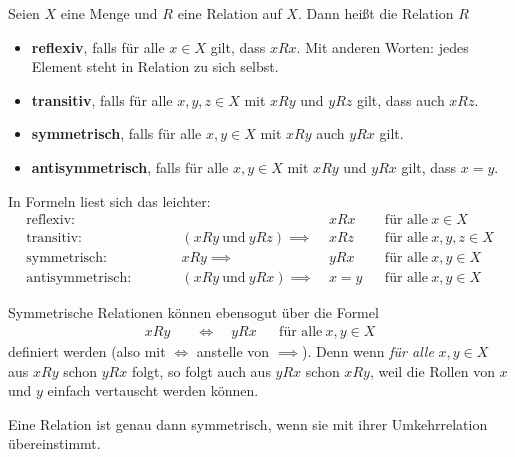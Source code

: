 \begin{defin}    
    Seien $X$ eine Menge und $R$ eine Relation auf $X$. Dann heißt die Relation $R$
    \begin{itemize}
        \item \textbf{reflexiv}, falls für alle $x\in X$ gilt, dass $xRx$. Mit anderen Worten: jedes Element steht in Relation zu sich selbst.
        \item \textbf{transitiv}, falls für alle $x,y,z\in X$ mit $xRy$ und $yRz$ gilt, dass auch $xRz$.
        \item \textbf{symmetrisch}, falls für alle $x,y\in X$ mit $xRy$ auch $yRx$ gilt.
        \item \textbf{antisymmetrisch}, falls für alle $x,y\in X$ mit $xRy$ und $yRx$ gilt, dass $x=y$.
    \end{itemize}
    In Formeln liest sich das leichter:
    \begin{align*}
        \text{reflexiv:} \qquad &&& xRx && \text{für alle}\ x\in X \\
        \text{transitiv:} \qquad && (xRy\ \text{und}\ yRz) \implies\ & xRz && \text{für alle}\ x,y,z\in X\\
        \text{symmetrisch:} \qquad && xRy \implies\ & yRx && \text{für alle}\ x,y\in X \\
        \text{antisymmetrisch:} \qquad && (xRy\ \text{und}\ yRx) \implies\ & x=y && \text{für alle}\ x,y\in X
    \end{align*}
\end{defin}


\begin{bem}
    Symmetrische Relationen können ebensogut über die Formel
    \begin{align*}
        xRy\quad & \iff \quad yRx && \text{für alle}\ x,y\in X
    \end{align*}
    definiert werden (also mit $\iff$ anstelle von $\implies$). Denn wenn \emph{für alle} $x,y\in X$ aus $xRy$ schon $yRx$ folgt, so folgt auch aus $yRx$ schon $xRy$, weil die Rollen von $x$ und $y$ einfach vertauscht werden können.

    Eine Relation ist genau dann symmetrisch, wenn sie mit ihrer Umkehrrelation übereinstimmt.
\end{bem}


